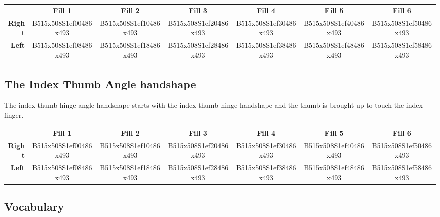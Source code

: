 \documentclass{article}
\begin{document}
\begin{center}
\begin{tabular}{r*{6}{c}}
&\textbf{Fill 1}&\textbf{Fill 2}&\textbf{Fill 3}&\textbf{Fill 4}&\textbf{Fill 5}&\textbf{Fill 6}\\
\textbf{Right}&
B515x508S1ef00486x493&
B515x508S1ef10486x493&
B515x508S1ef20486x493&
B515x508S1ef30486x493&
B515x508S1ef40486x493&
B515x508S1ef50486x493\\
\textbf{Left}&
B515x508S1ef08486x493&
B515x508S1ef18486x493&
B515x508S1ef28486x493&
B515x508S1ef38486x493&
B515x508S1ef48486x493&
B515x508S1ef58486x493\\
\end{tabular}
\end{center}

\subsection{The Index Thumb Angle handshape}

The index thumb hinge angle handshape starts with the index thumb hinge handshape and the thumb is brought up to touch the index finger.

\begin{center}
\begin{tabular}{r*{6}{c}}
&\textbf{Fill 1}&\textbf{Fill 2}&\textbf{Fill 3}&\textbf{Fill 4}&\textbf{Fill 5}&\textbf{Fill 6}\\
\textbf{Right}&
B515x508S1ef00486x493&
B515x508S1ef10486x493&
B515x508S1ef20486x493&
B515x508S1ef30486x493&
B515x508S1ef40486x493&
B515x508S1ef50486x493\\
\textbf{Left}&
B515x508S1ef08486x493&
B515x508S1ef18486x493&
B515x508S1ef28486x493&
B515x508S1ef38486x493&
B515x508S1ef48486x493&
B515x508S1ef58486x493\\
\end{tabular}
\end{center}

\subsection{Vocabulary}
\end{document}
